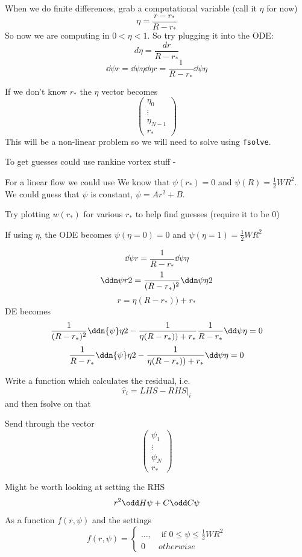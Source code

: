 \documentclass{X:/Documents/Coding/Latex/myreport}
\begin{document}
When we do finite differences, grab a computational variable (call it $\eta$ for now)
\[ \eta = \frac{r - r_*}{R-r_*}\]
So now we are computing in $0<\eta<1$.
So try plugging it into the ODE:
\[d\eta = \frac{dr}{R-r_*}\]
\[\dd\psi r = \dd\psi\eta \dd\eta r = \frac{1}{R-r_*} \dd\psi\eta\]

If we don't know $r_*$ the $\eta$ vector becomes
\[\begin{pmatrix}
    \eta_0\\
    \vdots\\
    \eta_{N-1}\\
    r_*
\end{pmatrix}\]
This will be a non-linear problem so we will need to solve using \verb|fsolve|.

To get guesses could use rankine vortex stuff - 

For a linear flow we could use
We know that $\psi(r_*) = 0$ and $\psi(R) = \frac12 WR^2$. We could guess that $\psi$ is constant, $\psi = Ar^2 + B$.

Try plotting $w(r_*)$ for various $r_*$ to help find guesses (require it to be $0$)



If using $\eta$, the ODE becomes
$\psi(\eta = 0) = 0$ and $\psi(\eta=1) = \frac12 WR^2$

\[\dd \psi r = \frac{1}{R-r_*} \dd\psi\eta \]
\[\ddn\psi r 2 = \frac{1}{(R-r_*)^2}\ddn\psi\eta 2\]
\[r = \eta(R-r_*)) +r_*\]
DE becomes
\[\frac{1}{(R-r_*)^2}\ddn{\psi}\eta2  -\frac{1}{\eta(R-r_*)) +r_*} \frac1{R-r_*}\dd\psi \eta =0\]
\[\frac{1}{R-r_*}\ddn{\psi}\eta2  -\frac{1}{\eta(R-r_*)) +r_*}\dd\psi \eta =0\]



\clearpage
Write a function which calculates the residual, i.e.
\[\hat{r}_i = LHS - RHS| _i\]
and then fsolve on that

Send through the vector
\[\begin{pmatrix}
    \psi_1\\
    \vdots\\
    \psi_N\\
    r_*
\end{pmatrix}\]



Might be worth looking at setting the RHS
\[r^2 \odd H\psi + C \odd C\psi \]
As a function $f(r,\psi)$ and the settings
\[f(r,\psi) = \begin{cases}
    \ldots, &\text{ if } 0 \leq \psi \leq \frac12 WR^2\\
    0 & otherwise
\end{cases}\]
\end{document}
